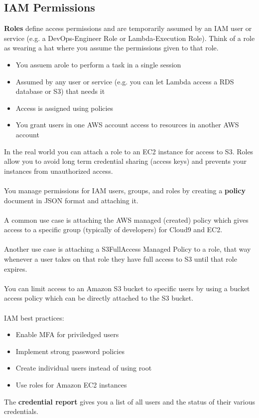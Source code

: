 \documentclass{article}%
\begin{document}
\subsection{IAM Permissions}
\textbf{Roles} define access permissions and are temporarily assumed by an IAM user or service (e.g. a DevOps-Engineer Role or Lambda-Execution Role). Think of a role as wearing a hat where you assume the permissions given to that role.
\begin{itemize}
    \item You assuem arole to perform a task in a single session
    \item Assumed by any user or service (e.g. you can let Lambda access a RDS database or S3) that needs it
    \item Access is assigned using policies
    \item You grant users in one AWS account access to resources in another AWS account
\end{itemize}
In the real world you can attach a role to an EC2 instance for access to S3. Roles allow you to avoid long term credential sharing (access keys) and prevents your instances from unauthorized access. \\ \\
You manage permissions for IAM users, groups, and roles by creating a \textbf{policy} document in JSON format and attaching it. \\ \\

A common use case is attaching the AWS managed (created) policy which gives access to a specific group (typically of developers) for Cloud9 and EC2. \\ \\
Another use case is attaching a S3FullAccess Managed Policy to a role, that way whenever a user takes on that role they have full access to S3 until that role expires. \\ \\ 
You can limit access to an Amazon S3 bucket to specific users by using a bucket access policy which can be directly attached to the S3 bucket. \\ \\
IAM best practices:
\begin{itemize}
    \item Enable MFA for priviledged users
    \item Implement strong password policies
    \item Create individual users instead of using root
    \item Use roles for Amazon EC2 instances
\end{itemize}
The \textbf{credential report} gives you a list of all users and the status of their various credentials.
\end{document}
